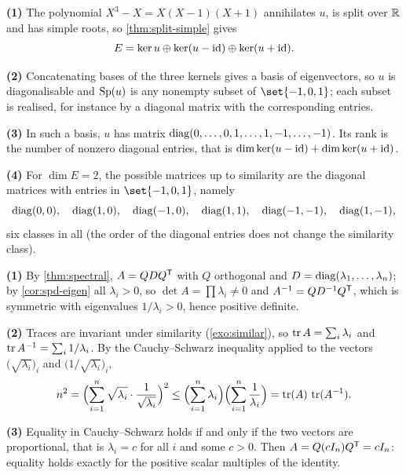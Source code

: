 \begin{solution}{}
\textbf{(1)} The polynomial $X^{3}-X=X(X-1)(X+1)$ annihilates $u$, is split over
$\mathbb{R}$ and has simple roots, so \cref{thm:split-simple} gives
\[
  E=\operatorname{ker} u\oplus\operatorname{ker}(u-\mathrm{id})\oplus\operatorname{ker}(u+\mathrm{id}).
\]

\textbf{(2)} Concatenating bases of the three kernels gives a basis of
eigenvectors, so $u$ is diagonalisable and $\operatorname{Sp}(u)$ is any nonempty subset of
$\set{-1,0,1}$; each subset is realised, for instance by a diagonal matrix with
the corresponding entries.

\textbf{(3)} In such a basis, $u$ has matrix $\operatorname{diag}(0,\dots,0,1,\dots,1,-1,\dots,-1)$.
Its rank is the number of nonzero diagonal entries, that is
$\dim\operatorname{ker}(u-\mathrm{id})+\dim\operatorname{ker}(u+\mathrm{id})$.

\textbf{(4)} For $\dim E=2$, the possible matrices up to similarity are the
diagonal matrices with entries in $\set{-1,0,1}$, namely
\[
  \operatorname{diag}(0,0),\quad\operatorname{diag}(1,0),\quad\operatorname{diag}(-1,0),\quad
  \operatorname{diag}(1,1),\quad\operatorname{diag}(-1,-1),\quad\operatorname{diag}(1,-1),
\]
six classes in all (the order of the diagonal entries does not change the
similarity class).
\end{solution}

\begin{solution}{}
\textbf{(1)} By \cref{thm:spectral}, $A=QDQ^{\mathsf{T}}$ with $Q$ orthogonal and
$D=\operatorname{diag}(\lambda_1,\dots,\lambda_n)$; by \cref{cor:spd-eigen} all
$\lambda_i>0$, so $\det A=\prod\lambda_i\neq0$ and
$A^{-1}=QD^{-1}Q^{\mathsf{T}}$, which is symmetric with eigenvalues
$1/\lambda_i>0$, hence positive definite.

\textbf{(2)} Traces are invariant under similarity (\cref{exo:similar}), so
$\operatorname{tr} A=\sum_i\lambda_i$ and $\operatorname{tr} A^{-1}=\sum_i 1/\lambda_i$. By the
Cauchy--Schwarz inequality applied to the vectors
$\bigl(\sqrt{\lambda_i}\bigr)_i$ and $\bigl(1/\sqrt{\lambda_i}\bigr)_i$,
\[
  n^{2}=\Bigl(\sum_{i=1}^{n}\sqrt{\lambda_i}\cdot\frac{1}{\sqrt{\lambda_i}}\Bigr)^{2}
  \leq\Bigl(\sum_{i=1}^{n}\lambda_i\Bigr)\Bigl(\sum_{i=1}^{n}\frac{1}{\lambda_i}\Bigr)
  =\operatorname{tr}(A)\,\operatorname{tr}(A^{-1}).
\]

\textbf{(3)} Equality in Cauchy--Schwarz holds if and only if the two vectors are
proportional, that is $\lambda_i=c$ for all $i$ and some $c>0$. Then
$A=Q(cI_n)Q^{\mathsf{T}}=cI_n$: equality holds exactly for the positive scalar
multiples of the identity.
\end{solution}


